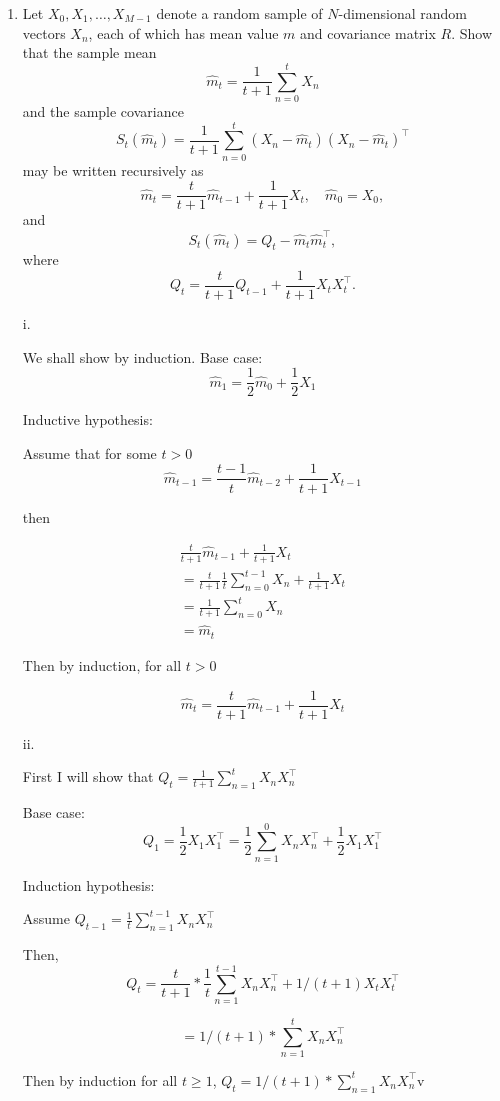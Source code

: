 \documentclass{article}
\begin{document}
\begin{enumerate}

\item
Let $X_0, X_1, \ldots, X_{M-1}$ denote a random sample of $N$-dimensional random vectors $X_n$, each of which has mean value $m$ and covariance matrix $R$.  Show that the sample mean
$$\hat m_t = \frac{1}{t+1} \sum_{n=0}^t  X_n$$
and the sample covariance 
$$S_t(\hat m_t) = \frac{1}{t+1} \sum_{n=0}^t (X_n - \hat m_t)(X_n - \hat m_t)^\top$$
may be written recursively as
$$\hat m_t = \frac{t}{t+1} \hat m_{t-1} + \frac{1}{t+1} X_t, \quad \hat m_0 = X_0,$$
and
$$S_t(\hat m_t) = Q_t - \hat m_t \hat m_t^\top,$$
where
$$ Q_t  = \frac{t}{t+1} Q_{t-1} + \frac{1}{t+1} X_t X_t^\top.$$

\color{blue}
i.

We shall show by induction.
Base case:
\[
\hat m_1 = \frac{1}{2} \hat m_0 + \frac{1}{2} X_1
\]

Inductive hypothesis:

Assume that for some $t>0$ 
$$
\hat{m}_{t-1} = \frac{t-1}{t} \hat m_{t-2} + \frac{1}{t+1}X_{t-1}
$$

then 

\begin{align*}
\frac{t}{t+1} \hat m_{t-1} + \frac{1}{t+1}X_t\\
= \frac{t}{t+1} \frac{1}{t} \sum_{n=0}^{t-1} X_n + \frac{1}{t+1}X_t\\
= \frac{1}{t+1} \sum_{n=0}^t  X_n \\
=\hat m_t
\end{align*}


Then by induction, for all $t>0$

$$\hat m_t = \frac{t}{t+1} \hat m_{t-1} + \frac{1}{t+1} X_t
$$

ii. 

First I will show that
$Q_t = \frac{1}{t+1}  \sum_{n=1}^t X_n X_n^\top$

Base case:
$$
Q_1 = \frac{1}{2} X_1 X_1^\top = \frac{1}{2}\sum_{n=1}^0 X_n X_n^\top + \frac{1}{2} X_1 X_1^\top
$$

Induction hypothesis:

Assume $Q_{t-1} = \frac{1}{t} \sum_{n=1}^{t-1} X_n X_n^\top$ 

Then, 
$$
Q_t = \frac{t}{t+1} * \frac{1}{t} \sum_{n=1} ^{t-1} X_n X_n^\top + 1/(t+1) X_t X_t ^\top
$$

$$
= 1/(t+1) * \sum_{n=1}^t X_n X_n^\top
$$


Then by induction for all $t \geq 1$, $Q_t = 1/(t+1) * \sum_{n=1}^t X_n X_n^\top$v



\end{enumerate}
\end{document}
